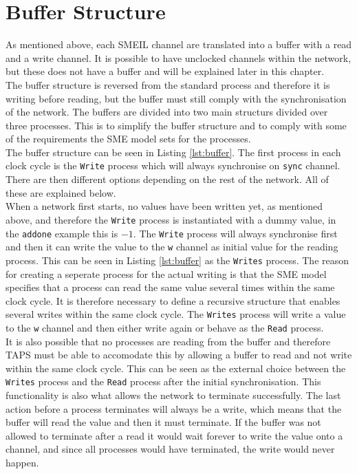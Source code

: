 \section{Buffer Structure}
As mentioned above, each SMEIL channel are translated into a buffer with a read and a write channel. It is possible to have unclocked channels within the network, but these does not have a buffer and will be explained later in this chapter. \\

The buffer structure is reversed from the standard process and therefore it is writing before reading, but the buffer must still comply with the synchronisation of the network.
The buffers are divided into two main structurs divided over three processes. This is to simplify the buffer structure and to comply with some of the requirements the SME model sets for the processes. \\

The buffer structure can be seen in Listing \ref{lst:buffer}. The first process in each clock cycle is the \texttt{Write} process which will always synchronise on \texttt{sync} channel. There are then different options depending on the rest of the network. All of these are explained below.\\

When a network first starts, no values have been written yet, as mentioned above, and therefore the \texttt{Write} process is instantiated with a dummy value, in the \texttt{addone} example this is $-1$. The \texttt{Write} process will always synchronise first and then it can write the value to the \texttt{w} channel as initial value for the reading process. This can be seen in Listing \ref{lst:buffer} as the \texttt{Writes} process. The reason for creating a seperate process for the actual writing is that the SME model specifies that a process %
can read the same value several times within the same clock cycle. It is therefore necessary to define a recursive structure that enables several writes within the same clock cycle. The \texttt{Writes} process will write a value to the \texttt{w} channel and then either write again or behave as the \texttt{Read} process.\\

It is also possible that no processes are reading from the buffer and therefore TAPS must be able to accomodate this by allowing a buffer to read and not write within the same clock cycle. This can be seen as the external choice between the \texttt{Writes} process and the \texttt{Read} process after the initial synchronisation. This functionality is also what allows the network to terminate successfully.
The last action before a process terminates will always %
be a write, which means that the buffer will read the value and then it must terminate. If the buffer was not allowed to terminate after a read it would wait forever to write the value onto a channel, and since all processes would have terminated, the write would never happen.\\

